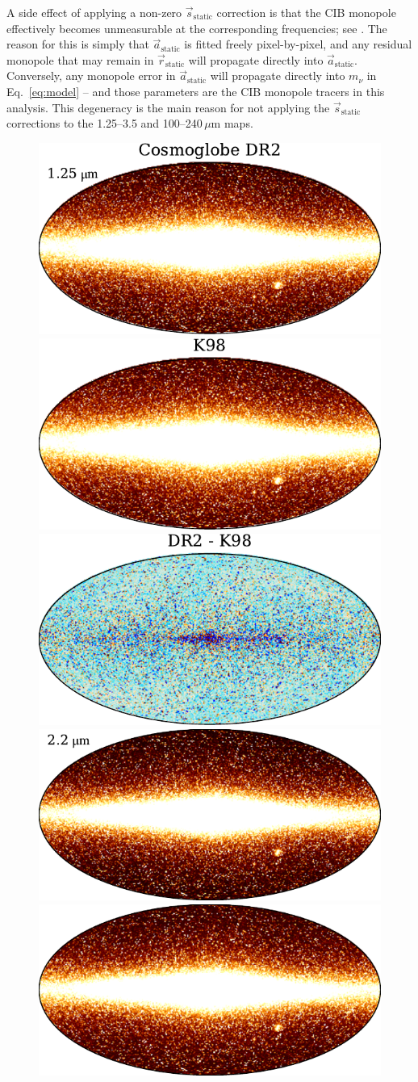 \documentclass{aa}
\newcommand{\s}[0]{\vec{s}}
\renewcommand{\a}[0]{\vec{a}}
\renewcommand{\r}[0]{\vec{r}}
\begin{document}
A side effect of applying a non-zero
$\s_{\mathrm{static}}$ correction is that the CIB monopole effectively
becomes unmeasurable at the corresponding frequencies; see
\citet{CG02_03}. The reason for this is simply that
$\a_{\mathrm{static}}$ is fitted freely pixel-by-pixel, and any
residual monopole that may remain in $\r_{\mathrm{static}}$ will
propagate directly into $\a_{\mathrm{static}}$. Conversely, any
monopole error in $\a_{\mathrm{static}}$ will propagate directly into
$m_{\nu}$ in Eq.~\eqref{eq:model} -- and those parameters are the CIB
monopole tracers in this analysis. This degeneracy is the main reason
for not applying the $\s_{\mathrm{static}}$ corrections to the
1.25--3.5 and 100--240$\,\mu$m maps.

\begin{figure}
	\centering
	\includegraphics[width=0.33\linewidth]{figs/CG_DIRBE_01_I_n0256_DR2.pdf}
        \includegraphics[width=0.33\linewidth]{figs/DIRBE_ZSMA_01_1_256.pdf}
        \includegraphics[width=0.33\linewidth]{figs/diff_CG_DIRBE_ZSMA_01_n256.pdf}\\
	\includegraphics[width=0.33\linewidth]{figs/CG_DIRBE_02_I_n0256_DR2.pdf}
        \includegraphics[width=0.33\linewidth]{figs/DIRBE_ZSMA_02_1_256.pdf}

\end{figure}
\end{document}
